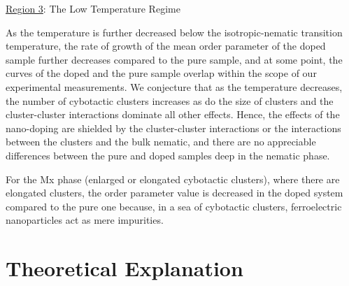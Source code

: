 \documentclass[reprint,amsfonts,amsmath,amssymb,aps,pre,floatfix,10pt]{revtex4-1}
\begin{document}
\underline{Region 3}: The Low Temperature Regime

As the temperature is further decreased below the isotropic-nematic transition temperature, the rate of growth of the mean order parameter of the doped sample further decreases compared to the pure sample, and at some point, the curves of the doped and the pure sample overlap within the scope of our experimental measurements. We conjecture that as the temperature decreases, the number of cybotactic clusters increases as do the size of clusters and the cluster-cluster interactions dominate all other effects. %
Hence, the effects of the nano-doping are shielded by the cluster-cluster interactions or the interactions between the clusters and the bulk nematic, and there are no appreciable differences between the pure and doped samples deep in the nematic phase. 

For the Mx phase (enlarged or elongated cybotactic clusters), where there are elongated clusters, the order parameter value is decreased in the doped system compared to the pure one because, in a sea of cybotactic clusters, ferroelectric nanoparticles act as mere impurities.



\section{Theoretical Explanation}
\end{document}
